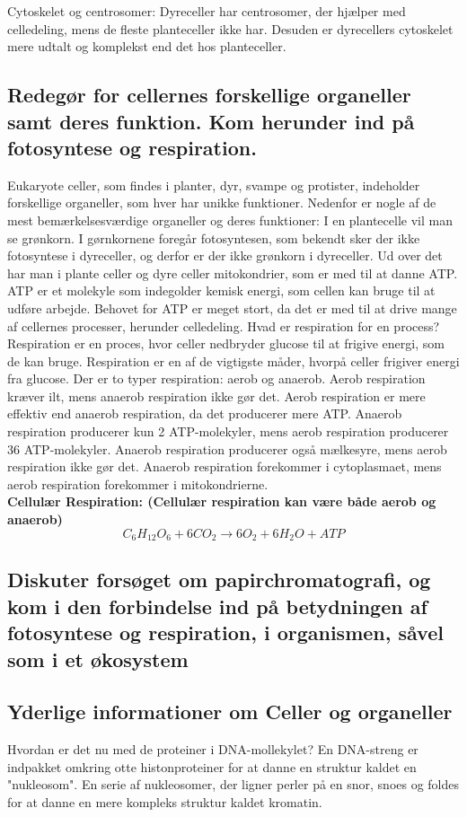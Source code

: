             Cytoskelet og centrosomer: Dyreceller har centrosomer, der hjælper med celledeling, mens de fleste planteceller ikke har. Desuden er dyrecellers cytoskelet mere udtalt og komplekst end det hos planteceller.

    \subsection{Redegør for cellernes forskellige organeller samt deres funktion. Kom herunder ind på fotosyntese og respiration.}
    Eukaryote celler, som findes i planter, dyr, svampe og protister, indeholder forskellige organeller, som hver har unikke funktioner. Nedenfor er nogle af de mest bemærkelsesværdige organeller og deres funktioner:
    I en plantecelle vil man se grønkorn. I gørnkornene foregår fotosyntesen, som bekendt sker der ikke fotosyntese i dyreceller, og derfor er der ikke grønkorn i dyreceller. Ud over det har man i plante celler og dyre celler mitokondrier, som er med til at danne ATP. ATP er et molekyle som indegolder kemisk energi, som cellen kan bruge til at udføre arbejde. Behovet for ATP er meget stort, da det er med til at drive mange af cellernes processer, herunder celledeling.
    Hvad er respiration for en process? Respiration er en proces, hvor celler nedbryder glucose til at frigive energi, som de kan bruge. Respiration er en af de vigtigste måder, hvorpå celler frigiver energi fra glucose. Der er to typer respiration: aerob og anaerob. 
    Aerob respiration kræver ilt, mens anaerob respiration ikke gør det. Aerob respiration er mere effektiv end anaerob respiration, da det producerer mere ATP. Anaerob respiration producerer kun 2 ATP-molekyler, mens aerob respiration producerer 36 ATP-molekyler. Anaerob respiration producerer også mælkesyre, mens aerob respiration ikke gør det. Anaerob respiration forekommer i cytoplasmaet, mens aerob respiration forekommer i mitokondrierne. \\
    \textbf{Cellulær Respiration: (Cellulær respiration kan være både aerob og anaerob) }\begin{equation}C_6H_{12}O_6 + 6CO_2 \rightarrow 6O_2 + 6H_2O + ATP \end{equation}


    \subsection{Diskuter forsøget om papirchromatografi, og kom i den forbindelse ind på betydningen af fotosyntese og respiration, i organismen, såvel som i et økosystem}

    \subsection{Yderlige informationer om Celler og organeller}
    Hvordan er det nu med de proteiner i DNA-mollekylet? \label{sec:protein} En DNA-streng er indpakket omkring otte histonproteiner for at danne en struktur kaldet en "nukleosom". En serie af nukleosomer, der ligner perler på en snor, snoes og foldes for at danne en mere kompleks struktur kaldet kromatin. 
